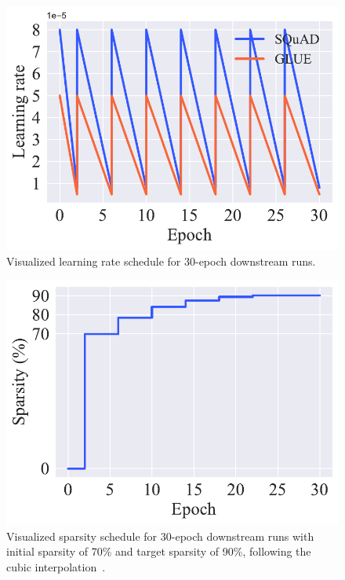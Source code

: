 \documentclass[11pt]{article}
\begin{document}
\begin{figure}[htb!]
    \centering
    \includegraphics[scale=0.5]{media/LR_30ep.pdf}
    \caption{Visualized learning rate schedule for 30-epoch downstream runs.}
    \label{fig:lr_30ep}
\end{figure}

\begin{figure}[htb!]
    \centering
    \includegraphics[scale=0.5]{media/sparsity90_30ep.pdf}
    \caption{Visualized sparsity schedule for 30-epoch downstream runs with initial sparsity of 70\% and target sparsity of 90\%, following the cubic interpolation~\cite{Zhu2018ToPO}.}
    \label{fig:spars90_ep30}
\end{figure}
\end{document}

